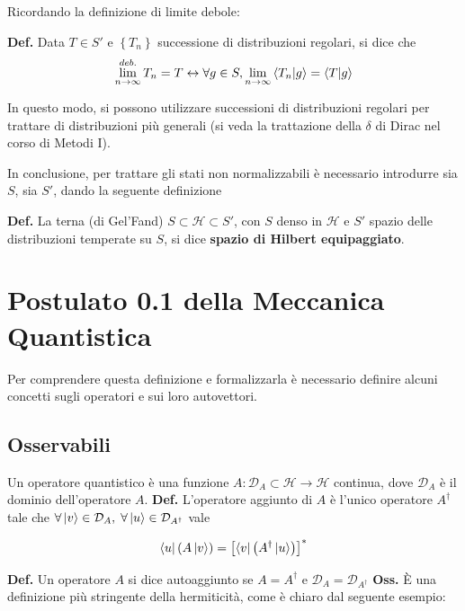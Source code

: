 Ricordando la definizione di limite debole:

\textbf{Def.} Data $ T\in S' $ e $\left\{ T_n \right\}$ successione di distribuzioni
regolari, si dice che 
$$ \lim\limits_{n\to\infty}^{deb.} T_n = T \leftrightarrow 
\forall g\in S, \lim\limits_{n\to\infty} \bra{T_n}\ket{g} = \bra{T}\ket{g}$$

In questo modo, si possono utilizzare successioni di distribuzioni regolari per
trattare di distribuzioni più generali (si veda la trattazione della $ \delta $ di 
Dirac nel corso di Metodi I).

In conclusione, per trattare gli stati non normalizzabili è necessario introdurre sia
$ S $, sia $ S' $, dando la seguente definizione

\textbf{Def.} La terna (di Gel'Fand) $ S\subset\mathcal{H}\subset S' $, con $S$ denso in
$ \mathcal{H} $ e $ S' $ spazio delle distribuzioni temperate su $ S$, si dice 
\textbf{spazio di Hilbert equipaggiato}.

\section{Postulato 0.1 della Meccanica Quantistica}

\noindent{}

Per comprendere questa definizione e formalizzarla è necessario definire alcuni concetti sugli
operatori e sui loro autovettori.

\subsection{Osservabili}
Un operatore quantistico è una funzione $ A: \mathcal{D}_A\subset\mathcal{H}\to\mathcal{H} $
continua, dove $ \mathcal{D}_A $ è il dominio dell'operatore $ A $.
\textbf{Def.} L'operatore aggiunto di $ A $ è l'unico operatore $ A^{\dagger} $ tale che
$ \forall \ket{v}\in\mathcal{D}_A,\; \forall \ket{u}\in\mathcal{D}_{A^{\dagger}}$ vale

$$ \bra{u} \left( A\ket{v} \right) = \left[ \bra{v} \left( A^{\dagger}\ket{u} \right) \right]^* $$ 
 
\textbf{Def.} Un operatore $ A $ si dice autoaggiunto se $ A = A^{\dagger} $ e
$\mathcal{D}_A = \mathcal{D}_{A^{\dagger}}$
\newpage
\textbf{Oss.} È una definizione più stringente della hermiticità, come è chiaro dal seguente
esempio:

